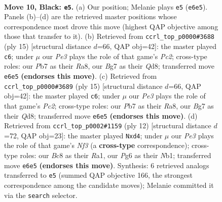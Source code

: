 \documentclass[11pt]{article}
\begin{document}
\clearpage

\begin{figure}[p]\centering
\begin{subfigure}{0.46\textwidth}\centering
\resizebox{\linewidth}{!}{%
\newchessgame
\chessboard[
  setfen={rnbq1rk1/pp3pbp/1n1pp1p1/8/3P4/1B2B3/PPP2PPP/RN1QNRK1 b - - 3 10},
  showmover=false,
  pgfstyle=straightmove, color=movearrow, markmove={e6-e5}
]}
\caption{}
\end{subfigure}\hfill
\begin{subfigure}{0.46\textwidth}\centering
\resizebox{\linewidth}{!}{%
\newchessgame
\chessboard[
  setfen={rnbq1rk1/ppp1ppbp/5np1/8/N2P1B2/4PN2/PP3PPP/R2QKB1R b KQ - 0 8},
  showmover=false,
  pgfstyle=straightmove, color=movearrow, markmove={c7-c6}
]}
\caption{}
\end{subfigure}
\\[4pt]
\begin{subfigure}{0.46\textwidth}\centering
\resizebox{\linewidth}{!}{%
\newchessgame
\chessboard[
  setfen={rnbq1rk1/ppp1ppbp/5np1/8/N2P1B2/4PN2/PP3PPP/R2QKB1R b KQ - 0 8},
  showmover=false,
  pgfstyle=straightmove, color=movearrow, markmove={c7-c6}
]}
\caption{}
\end{subfigure}\hfill
\begin{subfigure}{0.46\textwidth}\centering
\resizebox{\linewidth}{!}{%
\newchessgame
\chessboard[
  setfen={rn1qkb1r/pb1p1ppp/1p2pn2/8/2Pp4/5NP1/PP2PPBP/RNBQ1RK1 w kq - 0 7},
  showmover=false,
  pgfstyle=straightmove, color=movearrow, markmove={f3-d4}
]}
\caption{}
\end{subfigure}
\caption{\textbf{Move 10, Black: \texttt{e5}.} (a) Our position; Melanie plays \texttt{e5} (\texttt{e6e5}). Panels (b)--(d) are the retrieved master positions whose correspondence most drove this move (highest QAP objective among those that transfer to it). (b) Retrieved from \texttt{ccrl\_top\_p0000\#3688} (ply 15) [structural distance $d$=66, QAP obj=42]: the master played \texttt{c6}; under $\mu$ our \emph{Pe3} plays the role of that game's \emph{Pc2}; cross-type roles: our \emph{P}b7 as their \emph{R}a8, our \emph{B}g7 as their \emph{Q}d8; transferred move \texttt{e6e5} \textbf{(endorses this move)}. (c) Retrieved from \texttt{ccrl\_top\_p0000\#3689} (ply 15) [structural distance $d$=66, QAP obj=42]: the master played \texttt{c6}; under $\mu$ our \emph{Pe3} plays the role of that game's \emph{Pc2}; cross-type roles: our \emph{P}b7 as their \emph{R}a8, our \emph{B}g7 as their \emph{Q}d8; transferred move \texttt{e6e5} \textbf{(endorses this move)}. (d) Retrieved from \texttt{ccrl\_top\_p0002\#1159} (ply 12) [structural distance $d$=72, QAP obj=23]: the master played \texttt{Nxd4}; under $\mu$ our \emph{Pe3} plays the role of that game's \emph{Nf3} (a \textbf{cross-type} correspondence); cross-type roles: our \emph{B}c8 as their \emph{R}a1, our \emph{P}g6 as their \emph{N}b1; transferred move \texttt{e6e5} \textbf{(endorses this move)}. Synthesis: 6 retrieved analogs transferred to \texttt{e5} (summed QAP objective 166, the strongest correspondence among the candidate moves); Melanie committed it via the \texttt{search} selector.}
\label{fig:thought-m19}
\end{figure}
\end{document}
